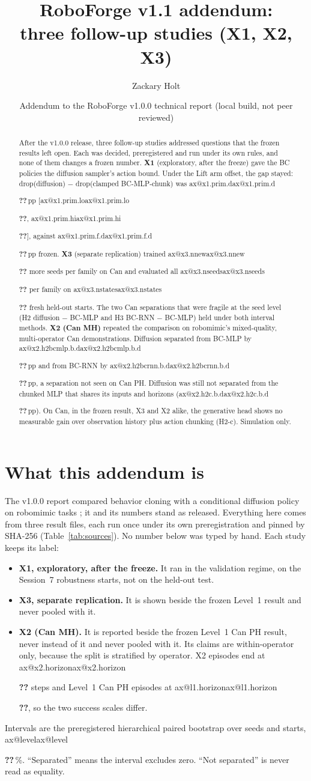 \documentclass[10pt,a4paper]{article}
\title{RoboForge v1.1 addendum:\\ three follow-up studies (X1, X2, X3)}
\author{Zackary Holt}
\date{Addendum to the RoboForge v1.0.0 technical report (local build, not peer reviewed)}
\makeatletter
\newcommand{\ax}[1]{\ifcsname ax@#1\endcsname\csname ax@#1\endcsname\else
  \PackageError{roboforge}{Undefined addendum key #1}{Run make addendum-assets}\textbf{??}\fi}
\newcommand{\pp}{\,pp}
\newcommand{\pct}{\,\%}
\makeatother
\begin{document}
\maketitle

\begin{abstract}
After the v1.0.0 release, three follow-up studies addressed questions that the frozen results
left open. Each was decided, preregistered and run under its own rules, and none of them
changes a frozen number. \textbf{X1} (exploratory, after the freeze) gave the BC policies the
diffusion sampler's action bound. Under the Lift arm offset, the gap stayed:
drop(diffusion) $-$ drop(clamped BC-MLP-chunk) was \ax{x1.prim.d}\pp{}
[\ax{x1.prim.lo}, \ax{x1.prim.hi}], against \ax{x1.prim.f.d}\pp{} frozen.
\textbf{X3} (separate replication) trained \ax{x3.nnew} more seeds per family on Can and
evaluated all \ax{x3.nseeds} per family on \ax{x3.nstates} fresh held-out starts. The two Can
separations that were fragile at the seed level (H2 diffusion $-$ BC-MLP and H3 BC-RNN $-$
BC-MLP) held under both interval methods. \textbf{X2 (Can MH)} repeated the comparison on
robomimic's mixed-quality, multi-operator Can demonstrations. Diffusion separated from BC-MLP
by \ax{x2.h2bcmlp.b.d}\pp{} and from BC-RNN by \ax{x2.h2bcrnn.b.d}\pp, a separation not seen on
Can PH. Diffusion was still not separated from the chunked MLP that shares its inputs and
horizons (\ax{x2.h2c.b.d}\pp). On Can, in the frozen result, X3 and X2 alike, the generative head shows no
measurable gain over observation history plus action chunking (H2-c). Simulation only.
\end{abstract}

\section{What this addendum is}
The v1.0.0 report compared behavior cloning with a conditional diffusion policy
\citep{chi2023diffusion} on robomimic tasks \citep{mandlekar2021robomimic}; it and its numbers
stand as released. Everything here comes from three result files, each run once under its own
preregistration and pinned by SHA-256 (Table~\ref{tab:sources}). No number below was typed by
hand. Each study keeps its label:
\begin{itemize}
\item \textbf{X1, exploratory, after the freeze.} It ran in the validation regime, on the
  Session~7 robustness starts, not on the held-out test.
\item \textbf{X3, separate replication.} It is shown beside the frozen Level~1 result and never
  pooled with it.
\item \textbf{X2 (Can MH).} It is reported beside the frozen Level~1 Can PH result, never instead
  of it and never pooled with it. Its claims are within-operator only, because the split is
  stratified by operator. X2 episodes end at \ax{x2.horizon} steps and Level~1 Can PH episodes
  at \ax{l1.horizon}, so the two success scales differ.
\end{itemize}
Intervals are the preregistered hierarchical paired bootstrap over seeds and starts, \ax{level}\pct.
``Separated'' means the interval excludes zero. ``Not separated'' is never read as equality.
\end{document}
